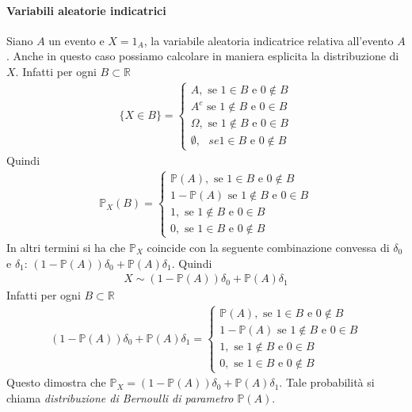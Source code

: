 \documentclass[a4paper,12pt]{article}
\begin{document}
\paragraph{Variabili aleatorie indicatrici} Siano $A$ un evento e $X=1_A$, la variabile aleatoria indicatrice relativa all'evento $A$. Anche in questo caso possiamo calcolare in maniera esplicita la distribuzione di $X$. Infatti per ogni $B \subset \mathbb{R}$
\begin{align*}
  \{X \in B\} = \begin{cases}
    A, \text{ se $1 \in B$ e $0 \notin B$}\\
    A^c \text{ se $1 \notin B$ e $0 \in B$}\\
    \Omega, \text{ se $1 \notin B$ e $0 \in B$}\\
    \emptyset, \text{ $se 1 \in B$ e $0 \notin B$}
  \end{cases}
\end{align*}
Quindi
\begin{align*}
  \mathbb{P}_X(B) = \begin{cases}
     \mathbb{P}(A), \text{ se $1 \in B$ e $0 \notin B$}\\
    1 - \mathbb{P}(A)\text{ se $1 \notin B$ e $0 \in B$}\\
    1, \text{ se $1 \notin B$ e $0 \in B$}\\
    0, \text{ se $1 \in B$ e $0 \notin B$}
  \end{cases}
\end{align*}
In altri termini si ha che $\mathbb{P}_X$ coincide con la seguente combinazione convessa di $\delta_0$ e $\delta_1$: $(1-\mathbb{P}(A))\delta_0 + \mathbb{P}(A)\delta_1$. Quindi
\begin{align*}
    X \sim (1-\mathbb{P}(A))\delta_0 + \mathbb{P}(A)\delta_1
\end{align*}
Infatti per ogni $B \subset \mathbb{R}$
\begin{align*}
  (1-\mathbb{P}(A))\delta_0 + \mathbb{P}(A)\delta_1 = \begin{cases}
     \mathbb{P}(A), \text{ se $1 \in B$ e $0 \notin B$}\\
    1 - \mathbb{P}(A)\text{ se $1 \notin B$ e $0 \in B$}\\
    1, \text{ se $1 \notin B$ e $0 \in B$}\\
    0, \text{ se $1 \in B$ e $0 \notin B$}
  \end{cases}
\end{align*}
Questo dimostra che $\mathbb{P}_X = (1-\mathbb{P}(A))\delta_0 + \mathbb{P}(A)\delta_1 $. Tale probabilità si chiama \textit{distribuzione di Bernoulli di parametro $\mathbb{P}(A)$}.
\end{document}
